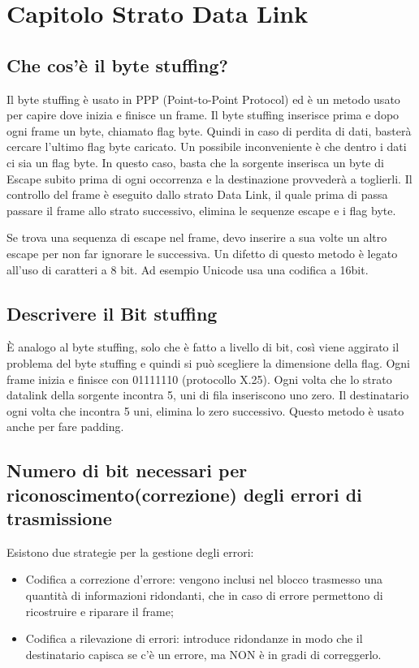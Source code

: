 \section{Capitolo Strato Data Link}

\subsection{Che cos'è il byte stuffing?}

Il byte stuffing è usato in PPP (Point-to-Point Protocol) ed è un metodo usato per capire dove inizia e finisce un frame. Il byte stuffing inserisce prima e dopo ogni frame un byte, chiamato flag byte.
Quindi in caso di perdita di dati, basterà cercare l'ultimo flag byte caricato. Un possibile
inconveniente è che dentro i dati ci sia un flag byte. In questo caso, basta che la sorgente inserisca un byte di Escape subito prima di ogni occorrenza e la destinazione provvederà a toglierli.
Il controllo del frame è eseguito dallo strato Data Link, il quale prima di passa passare il frame allo strato successivo, elimina le sequenze escape e i flag byte.

Se trova una sequenza di escape nel frame, devo inserire a sua volte un altro escape per non far
ignorare le successiva. Un difetto di questo metodo è legato all’uso di caratteri a 8 bit. Ad esempio Unicode usa una codifica a 16bit.

\subsection{Descrivere il Bit stuffing}

È analogo al byte stuffing, solo che è fatto a livello di bit, così viene aggirato il problema del byte stuffing e quindi si può scegliere la dimensione della flag. Ogni frame inizia e finisce con 01111110 (protocollo X.25). Ogni volta che lo strato datalink della sorgente incontra 5, uni di fila inseriscono uno zero. Il destinatario ogni volta che incontra 5 uni, elimina lo zero successivo. Questo metodo è usato anche per fare padding.

\subsection{Numero di bit necessari per riconoscimento(correzione) degli errori di trasmissione}

Esistono due strategie per la gestione degli errori:

\begin{itemize}

\item Codifica a correzione d’errore: vengono inclusi nel blocco trasmesso una quantità di
informazioni ridondanti, che in caso di errore permettono di ricostruire e riparare il frame;
\item Codifica a rilevazione di errori: introduce ridondanze in modo che il destinatario capisca se
c’è un errore, ma NON è in gradi di correggerlo.

\end{itemize}

